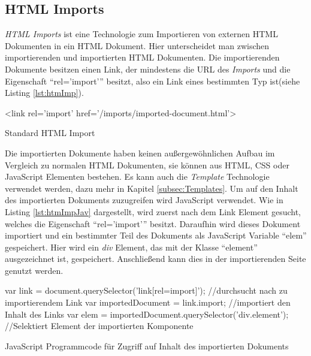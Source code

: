 \documentclass[12pt, paper=a4, bibtotoc, toc=listof, headsepline=true]{scrreprt}
\begin{document}
		\subsection{HTML Imports}
		\emph{\ac{HTML} Imports} ist eine Technologie zum Importieren von externen \ac{HTML} Dokumenten in ein \ac{HTML} Dokument. Hier unterscheidet man zwischen importierenden und importierten \ac{HTML} Dokumenten. Die importierenden Dokumente besitzen einen Link, der mindestens die \ac{URL} des \emph{Imports} und die Eigenschaft \enquote{rel='import'} besitzt, also ein Link eines bestimmten Typ ist\cite{Glazkov2016}(siehe Listing \ref{lst:htmImp}). 
		\begin{listing}
			\begin{HTMLcode*}{}
 <link rel='import' href='/imports/imported-document.html'>
				\end{HTMLcode*}
			\caption{Standard HTML Import}
			\label{lst:htmImp}
		\end{listing}
		Die importierten Dokumente haben keinen außergewöhnlichen Aufbau im Vergleich zu normalen \ac{HTML} Dokumenten, sie können aus \ac{HTML}, \ac{CSS} oder JavaScript Elementen bestehen. Es kann auch die \emph{Template} Technologie verwendet werden, dazu mehr in Kapitel \ref{subsec:Templates}.
		Um auf den Inhalt des importierten Dokuments zuzugreifen wird JavaScript verwendet. Wie in Listing \ref{lst:htmImpJav} dargestellt, wird zuerst nach dem Link Element gesucht, welches die Eigenschaft \enquote{rel='import'} besitzt. Daraufhin wird dieses Dokument importiert und ein bestimmter Teil des Dokuments als JavaScript Variable \enquote{elem} gespeichert. Hier wird ein \emph{div} Element, das mit der Klasse \enquote{element} ausgezeichnet ist, gespeichert. Anschließend kann dies in der importierenden Seite genutzt werden. 
		\begin{listing}
			\begin{JavaScriptcode*}{}
var link = document.querySelector('link[rel=import]'); //durchsucht nach zu importierendem Link
var importedDocument = link.import; //importiert den Inhalt des Links
var elem = importedDocument.querySelector('div.element');  //Selektiert Element der importierten Komponente
			\end{JavaScriptcode*}
			\caption[Zugriff auf importiertes Dokument]{JavaScript Programmcode für Zugriff auf Inhalt des importierten Dokuments}
			\label{lst:htmImpJav}
		\end{listing} 
\end{document}
